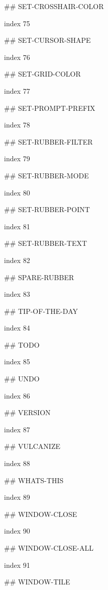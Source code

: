## SET-CROSSHAIR-COLOR

index 75



## SET-CURSOR-SHAPE

index 76



## SET-GRID-COLOR

index 77



## SET-PROMPT-PREFIX

index 78



## SET-RUBBER-FILTER

index 79



## SET-RUBBER-MODE

index 80



## SET-RUBBER-POINT

index 81



## SET-RUBBER-TEXT

index 82



## SPARE-RUBBER

index 83



## TIP-OF-THE-DAY

index 84



## TODO

 index 85



## UNDO

 index 86



## VERSION

index 87



## VULCANIZE

index 88



## WHATS-THIS

index 89



## WINDOW-CLOSE

index 90



## WINDOW-CLOSE-ALL

index 91



## WINDOW-TILE

